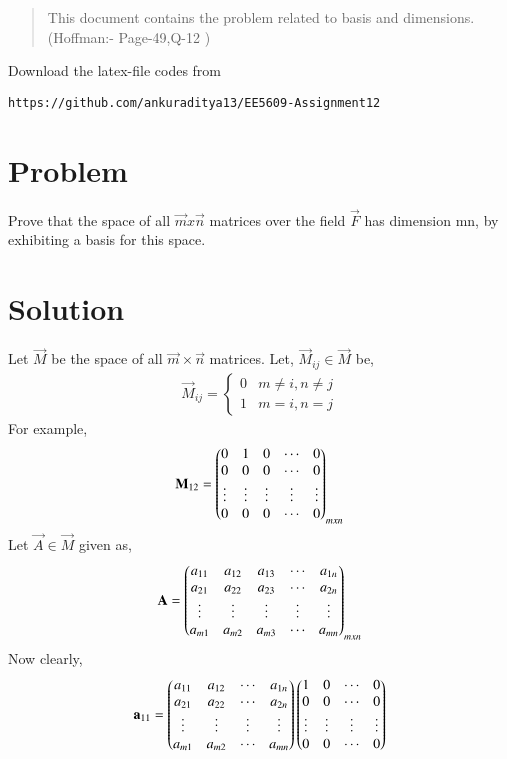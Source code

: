 \documentclass[journal,12pt,twocolumn]{IEEEtran}
\begin{document}
\begin{abstract}
This document contains the problem related to basis and dimensions.(Hoffman:- Page-49,Q-12 ) 
\end{abstract}
Download the latex-file codes from 
\begin{lstlisting}
https://github.com/ankuraditya13/EE5609-Assignment12
\end{lstlisting}

\section{Problem}
Prove that the space of all $\vec{m} x \vec{n}$ matrices over the field $\vec{F}$ has dimension mn, by exhibiting a basis for this space. 
\section{Solution}
Let $\vec{M}$ be the space of all $\vec{m}\times\vec{n}$ matrices. Let, $\vec{M}_{ij} \in \vec{M}$ be,
\begin{align}
\vec{M}_{ij} = \begin{cases} 0 &  m\neq i, n\neq j \\ 1 & m=i,n=j \end{cases}
\end{align}
For example,
\begin{align}
\mathbf{M}_{12} = \begin{pmatrix}0&1&0&\cdots&0\\0&0&0&\cdots&0\\\vdots&\vdots&\vdots&\vdots&\vdots\\0&0&0&\cdots&0\end{pmatrix}_{mxn}\\
\end{align}
Let $\vec{A} \in \vec{M}$ given as,
\begin{align}
\mathbf{A} = \begin{pmatrix}a_{11}&a_{12}&a_{13}&\cdots&a_{1n}\\a_{21}&a_{22}&a_{23}&\cdots&a_{2n}\\\vdots&\vdots&\vdots&\vdots&\vdots\\a_{m1}&a_{m2}&a_{m3}&\cdots&a_{mn}\end{pmatrix}_{mxn}
\end{align}
Now clearly,
\begin{align}
\mathbf{a}_{11} = \begin{pmatrix}a_{11}&a_{12}&\cdots&a_{1n}\\a_{21}&a_{22}&\cdots&a_{2n}\\\vdots&\vdots&\vdots&\vdots\\a_{m1}&a_{m2}&\cdots&a_{mn}\end{pmatrix} \begin{pmatrix}1&0&\cdots&0\\0&0&\cdots&0\\\vdots&\vdots&\vdots&\vdots\\0&0&\cdots&0\end{pmatrix}
\end{align}
\end{document}
